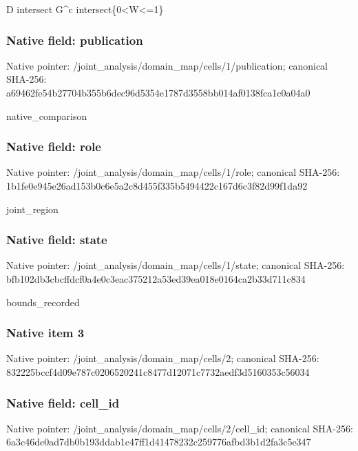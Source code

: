 \documentclass[10pt,a4paper]{article}
\begin{document}
\begingroup\raggedright\sloppy D intersect G\textasciicircum{}c intersect\{0<W<=\allowbreak{}1\}\par\endgroup

\subsubsection{Native field: publication}
Native pointer: /joint\_\allowbreak{}analysis/domain\_\allowbreak{}map/cells/1/publication; canonical SHA-256: a69462fe54b27704b355b6dec96d5354e1787d3558bb014af0138fca1c0a04a0

\begingroup\raggedright\sloppy native\_\allowbreak{}comparison\par\endgroup

\subsubsection{Native field: role}
Native pointer: /joint\_\allowbreak{}analysis/domain\_\allowbreak{}map/cells/1/role; canonical SHA-256: 1b1fe0e945e26ad153b0c6e5a2c8d455f335b5494422c167d6c3f82d99f1da92

\begingroup\raggedright\sloppy joint\_\allowbreak{}region\par\endgroup

\subsubsection{Native field: state}
Native pointer: /joint\_\allowbreak{}analysis/domain\_\allowbreak{}map/cells/1/state; canonical SHA-256: bfb102db3cbcffdcf0a4e0c3eac375212a53ed39ea018e0164ca2b33d711c834

\begingroup\raggedright\sloppy bounds\_\allowbreak{}recorded\par\endgroup

\subsubsection{Native item 3}
Native pointer: /joint\_\allowbreak{}analysis/domain\_\allowbreak{}map/cells/2; canonical SHA-256: 832225bccf4d09e787c0206520241c8477d12071c7732aedf3d5160353c56034

\subsubsection{Native field: cell\_\allowbreak{}id}
Native pointer: /joint\_\allowbreak{}analysis/domain\_\allowbreak{}map/cells/2/cell\_\allowbreak{}id; canonical SHA-256: 6a3c46de0ad7db0b193ddab1c47ff1d41478232c259776afbd3b1d2fa3c5e347
\end{document}
